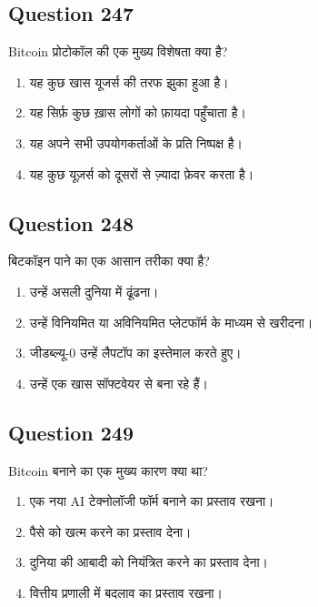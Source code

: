 \documentclass[12pt,a4paper]{article}
\begin{document}
\bigskip


\subsection*{Question 247}
Bitcoin प्रोटोकॉल की एक मुख्य विशेषता क्या है?

\begin{enumerate}[label=\Alph*., leftmargin=*]
\item यह कुछ खास यूजर्स की तरफ झुका हुआ है।
\item यह सिर्फ़ कुछ ख़ास लोगों को फ़ायदा पहुँचाता है।
\item यह अपने सभी उपयोगकर्ताओं के प्रति निष्पक्ष है।
\item यह कुछ यूज़र्स को दूसरों से ज़्यादा फ़ेवर करता है।
\end{enumerate}

\bigskip


\subsection*{Question 248}
बिटकॉइन पाने का एक आसान तरीका क्या है?

\begin{enumerate}[label=\Alph*., leftmargin=*]
\item उन्हें असली दुनिया में ढूंढना।
\item उन्हें विनियमित या अविनियमित प्लेटफॉर्म के माध्यम से खरीदना।
\item जीडब्ल्यू-0 उन्हें लैपटॉप का इस्तेमाल करते हुए।
\item उन्हें एक खास सॉफ्टवेयर से बना रहे हैं।
\end{enumerate}

\bigskip


\subsection*{Question 249}
Bitcoin बनाने का एक मुख्य कारण क्या था?

\begin{enumerate}[label=\Alph*., leftmargin=*]
\item एक नया AI टेक्नोलॉजी फॉर्म बनाने का प्रस्ताव रखना।
\item पैसे को खत्म करने का प्रस्ताव देना।
\item दुनिया की आबादी को नियंत्रित करने का प्रस्ताव देना।
\item वित्तीय प्रणाली में बदलाव का प्रस्ताव रखना।
\end{enumerate}
\end{document}
